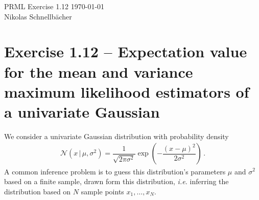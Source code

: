 \documentclass[11pt,DINA4, fleqn]{amsart}
\begin{document}

\tikzset{node distance = 2cm, auto}



\begin{flushleft}
{\sc \Large PRML Exercise 1.12} \hfill \today \\
\medskip
Nikolas Schnellbächer \underline{\hspace{6.53in}} \\
\end{flushleft}

\section*{Exercise 1.12 -- Expectation value for the mean and variance maximum likelihood estimators of a univariate Gaussian}
We consider a univariate Gaussian distribution with probability density
\begin{align}
\mathcal{N}\left(x \,\bigl| \, \mu, \sigma^2\right) = \dfrac{1}{\sqrt{2\pi \sigma^2}}\exp\left(-\dfrac{(x-\mu)^2}{2\sigma^2}\right) \, .
\end{align}
A common inference problem is to guess this distribution's parameters $\mu$ and $\sigma^2$ based on a finite sample, drawn form this distribution, \textit{i.e.}
inferring the distribution based on $N$ sample points $x_1, \dots, x_N$.
\end{document}
